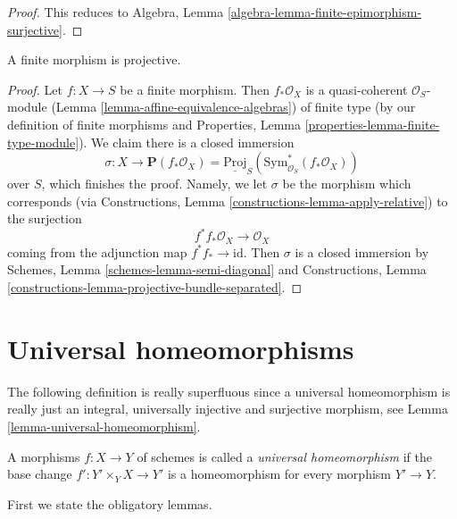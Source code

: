 \begin{proof}
This reduces to
Algebra, Lemma \ref{algebra-lemma-finite-epimorphism-surjective}.
\end{proof}

\begin{lemma}
\label{lemma-finite-projective}
A finite morphism is projective.
\end{lemma}

\begin{proof}
Let $f : X \to S$ be a finite morphism. Then $f_*\mathcal{O}_X$ is
a quasi-coherent $\mathcal{O}_S$-module
(Lemma \ref{lemma-affine-equivalence-algebras})
of finite type
(by our definition of finite morphisms and
Properties, Lemma \ref{properties-lemma-finite-type-module}).
We claim there is a closed immersion
$$
\sigma :
X
\longrightarrow
\mathbf{P}(f_*\mathcal{O}_X) =
\underline{\text{Proj}}_S(\text{Sym}^*_{\mathcal{O}_S}(f_*\mathcal{O}_X))
$$
over $S$, which finishes
the proof. Namely, we let $\sigma$ be the morphism which corresponds
(via Constructions, Lemma \ref{constructions-lemma-apply-relative})
to the surjection
$$
f^*f_*\mathcal{O}_X \longrightarrow \mathcal{O}_X
$$
coming from the adjunction map $f^*f_* \to \text{id}$. Then $\sigma$
is a closed immersion by
Schemes, Lemma \ref{schemes-lemma-semi-diagonal} and
Constructions, Lemma \ref{constructions-lemma-projective-bundle-separated}.
\end{proof}







\section{Universal homeomorphisms}
\label{section-universal-homeomorphisms}

\noindent
The following definition is really superfluous since a universal
homeomorphism is really just an integral, universally injective
and surjective morphism, see
Lemma \ref{lemma-universal-homeomorphism}.

\begin{definition}
\label{definition-universal-homeomorphism}
A morphisms $f : X \to Y$ of schemes is called a {\it universal homeomorphism}
if the base change $f' : Y' \times_Y X \to Y'$ is a homeomorphism for
every morphism $Y' \to Y$.
\end{definition}

\noindent
First we state the obligatory lemmas.

